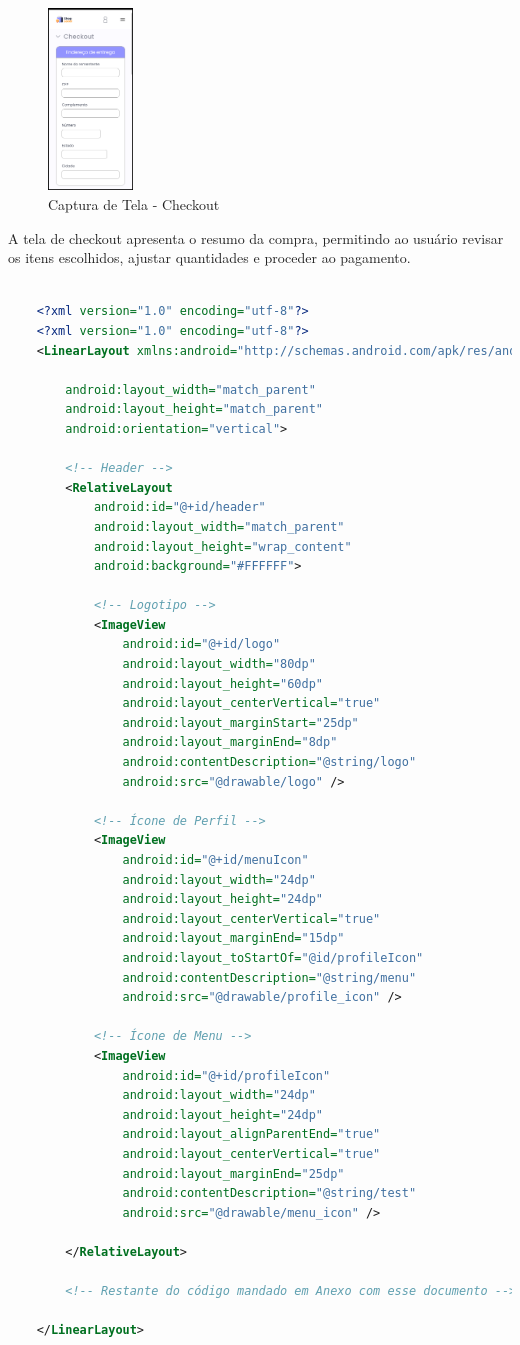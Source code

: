 \documentclass[
	12pt,				%
	openright,			%
	twoside,			%
	a4paper,			%
	english,			%
	brazil				%
	]{abntex2}
\begin{document}
\begin{figure}[htb]
    \centering
    \includegraphics[width=0.2\textwidth]{img/checkout}
    \caption{Captura de Tela - Checkout}
\end{figure}

A tela de checkout apresenta o resumo da compra, permitindo ao usuário revisar os itens escolhidos, ajustar quantidades e proceder ao pagamento.

\begin{lstlisting}[language=XML, caption=Código XML da tela de Checkout, label=lst:xml]

	<?xml version="1.0" encoding="utf-8"?>
	<?xml version="1.0" encoding="utf-8"?>
	<LinearLayout xmlns:android="http://schemas.android.com/apk/res/android"
	
		android:layout_width="match_parent"
		android:layout_height="match_parent"
		android:orientation="vertical">
	
		<!-- Header -->
		<RelativeLayout
			android:id="@+id/header"
			android:layout_width="match_parent"
			android:layout_height="wrap_content"
			android:background="#FFFFFF">
	
			<!-- Logotipo -->
			<ImageView
				android:id="@+id/logo"
				android:layout_width="80dp"
				android:layout_height="60dp"
				android:layout_centerVertical="true"
				android:layout_marginStart="25dp"
				android:layout_marginEnd="8dp"
				android:contentDescription="@string/logo"
				android:src="@drawable/logo" />
	
			<!-- Ícone de Perfil -->
			<ImageView
				android:id="@+id/menuIcon"
				android:layout_width="24dp"
				android:layout_height="24dp"
				android:layout_centerVertical="true"
				android:layout_marginEnd="15dp"
				android:layout_toStartOf="@id/profileIcon"
				android:contentDescription="@string/menu"
				android:src="@drawable/profile_icon" />
	
			<!-- Ícone de Menu -->
			<ImageView
				android:id="@+id/profileIcon"
				android:layout_width="24dp"
				android:layout_height="24dp"
				android:layout_alignParentEnd="true"
				android:layout_centerVertical="true"
				android:layout_marginEnd="25dp"
				android:contentDescription="@string/test"
				android:src="@drawable/menu_icon" />
	
		</RelativeLayout>
		
		<!-- Restante do código mandado em Anexo com esse documento -->
	
	</LinearLayout>

\end{lstlisting}
\end{document}
